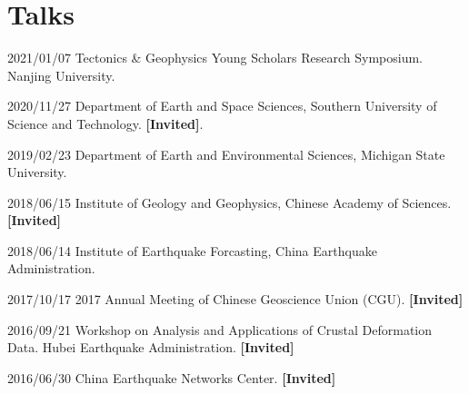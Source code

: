 \section{Talks}

\newcommand{\Invited}{\textbf{[Invited]}}

\begin{etaremune}
\item 2021/01/07 Tectonics \& Geophysics Young Scholars Research Symposium. Nanjing University.
\item 2020/11/27 Department of Earth and Space Sciences, Southern University of Science and Technology. \Invited.
\item 2019/02/23 Department of Earth and Environmental Sciences, Michigan State University.
\item 2018/06/15 Institute of Geology and Geophysics, Chinese Academy of Sciences. \Invited
\item 2018/06/14 Institute of Earthquake Forcasting, China Earthquake Administration.
\item 2017/10/17 2017 Annual Meeting of Chinese Geoscience Union (CGU). \Invited
\item 2016/09/21 Workshop on Analysis and Applications of Crustal Deformation Data. Hubei Earthquake Administration. \Invited
\item 2016/06/30 China Earthquake Networks Center. \Invited
\end{etaremune}
